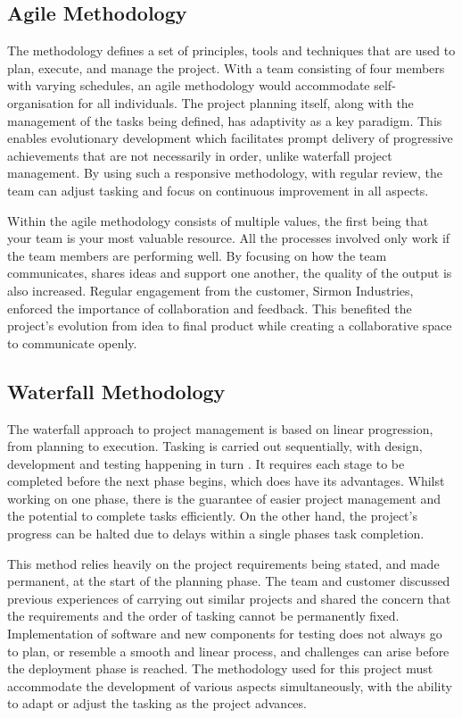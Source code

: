 \documentclass [12pt]{article}
\begin{document}
\subsection{Agile Methodology}\label{sec:agile}
The methodology defines a set of principles, tools and techniques that are used to plan, execute, and manage the project. With a team consisting of four members with varying schedules, an agile methodology would accommodate self-organisation for all individuals. The project planning itself, along with the management of the tasks being defined, has adaptivity as a key paradigm. This enables evolutionary development which facilitates prompt delivery of progressive achievements that are not necessarily in order, unlike waterfall project management. By using such a responsive methodology, with regular review, the team can adjust tasking and focus on continuous improvement in all aspects.

Within the agile methodology consists of multiple values, the first being that your team is your most valuable resource. All the processes involved only work if the team members are performing well. By focusing on how the team communicates, shares ideas and support one another, the quality of the output is also increased. Regular engagement from the customer, Sirmon Industries, enforced the importance of collaboration and feedback. This benefited the project's evolution from idea to final product while creating a collaborative space to communicate openly.

\subsection{Waterfall Methodology}\label{sec:waterfall}
The waterfall approach to project management is based on linear progression, from planning to execution. Tasking is carried out sequentially, with design, development and testing happening in turn \cite{Waterfall_Meth}. It requires each stage to be completed before the next phase begins, which does have its advantages. Whilst working on one phase, there is the guarantee of easier project management and the potential to complete tasks efficiently. On the other hand, the project’s progress can be halted due to delays within a single phases task completion.

This method relies heavily on the project requirements being stated, and made permanent, at the start of the planning phase. The team and customer discussed previous experiences of carrying out similar projects and shared the concern that the requirements and the order of tasking cannot be permanently fixed.  Implementation of software and new components for testing does not always go to plan, or resemble a smooth and linear process, and challenges can arise before the deployment phase is reached. The methodology used for this project must accommodate the development of various aspects simultaneously, with the ability to adapt or adjust the tasking as the project advances.
\end{document}
